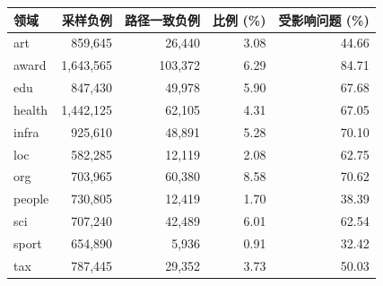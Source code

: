 \begin{tabular}{lrrrr}
\toprule
领域 & 采样负例 & 路径一致负例 & 比例 (\%) & 受影响问题 (\%) \\
\midrule
art & 859,645 & 26,440 & 3.08 & 44.66 \\
award & 1,643,565 & 103,372 & 6.29 & 84.71 \\
edu & 847,430 & 49,978 & 5.90 & 67.68 \\
health & 1,442,125 & 62,105 & 4.31 & 67.05 \\
infra & 925,610 & 48,891 & 5.28 & 70.10 \\
loc & 582,285 & 12,119 & 2.08 & 62.75 \\
org & 703,965 & 60,380 & 8.58 & 70.62 \\
people & 730,805 & 12,419 & 1.70 & 38.39 \\
sci & 707,240 & 42,489 & 6.01 & 62.54 \\
sport & 654,890 & 5,936 & 0.91 & 32.42 \\
tax & 787,445 & 29,352 & 3.73 & 50.03 \\
\bottomrule
\end{tabular}
